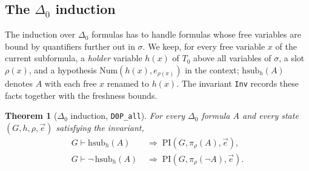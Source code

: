 \documentclass[11pt]{article}
\theoremstyle{plain}
\newtheorem{theorem}{Theorem}[section]
\theoremstyle{definition}
\theoremstyle{remark}
\newcommand{\T}[1]{T_{#1}}
\newcommand{\Num}{\mathrm{Num}}
\newcommand{\PRI}{\mathrm{PI}}
\newcommand{\rocq}[1]{\texttt{#1}}
\begin{document}
\subsection{The \texorpdfstring{$\Delta_0$}{Delta-0} induction}\label{sec:delta0}

The induction over $\Delta_0$ formulas has to handle formulas whose free
variables are bound by quantifiers further out in $\sigma$.  We keep, for
every free variable $x$ of the current subformula, a \emph{holder}
variable $h(x)$ of $\T0$ above all variables of $\sigma$, a slot
$\rho(x)$, and a hypothesis $\Num(h(x), e_{\rho(x)})$ in the context;
$\mathrm{hsub}_h(A)$ denotes $A$ with each free $x$ renamed to $h(x)$.
The invariant \rocq{Inv} records these facts together with the freshness
bounds.

\begin{theorem}[$\Delta_0$ induction, \rocq{D0P\_all}]\label{thm:delta0}
For every $\Delta_0$ formula $A$ and every state $(G, h, \rho, \vec e)$
satisfying the invariant,
\begin{align*}
  G \vdash \mathrm{hsub}_h(A) &\;\Longrightarrow\; \PRI(G, \pi_\rho(A), \vec e),\\
  G \vdash \neg\,\mathrm{hsub}_h(A) &\;\Longrightarrow\;
  \PRI(G, \pi_\rho(\neg A), \vec e).
\end{align*}
\end{theorem}
\end{document}
